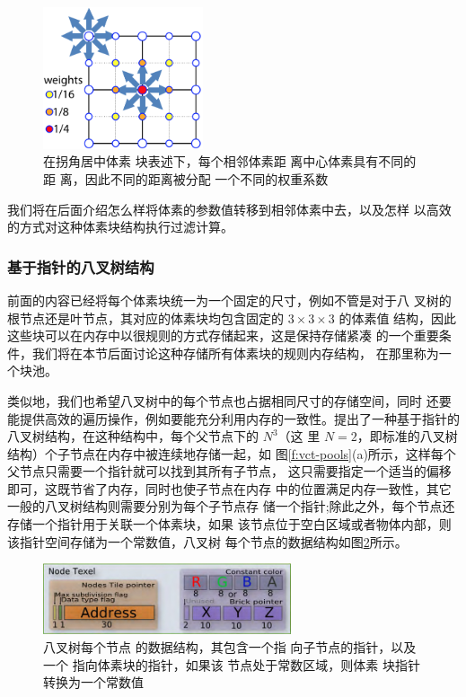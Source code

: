 \begin{figure}
	\sidecaption
	\includegraphics[width=0.42\textwidth]{figures/vct/vct-mipmapping}
	\caption{在拐角居中体素 块表述下，每个相邻体素距 离中心体素具有不同的距 离，因此不同的距离被分配 一个不同的权重系数}
	\label{f:vct-mipmapping}
\end{figure}

我们将在后面介绍怎么样将体素的参数值转移到相邻体素中去，以及怎样 以高效的方式对这种体素块结构执行过滤计算。



\subsubsection{基于指针的八叉树结构}
前面的内容已经将每个体素块统一为一个固定的尺寸，例如不管是对于八 叉树的根节点还是叶节点，其对应的体素块均包含固定的 $3\times  3\times  3$ 的体素值 结构，因此这些块可以在内存中以很规则的方式存储起来，这是保持存储紧凑 的一个重要条件，我们将在本节后面讨论这种存储所有体素块的规则内存结构， 在那里称为一个块池。

类似地，我们也希望八叉树中的每个节点也占据相同尺寸的存储空间，同时 还要能提供高效的遍历操作，例如要能充分利用内存的一致性。\cite{a:Gigavoxels:Avoxelbasedrenderingpipelineforefficientexplorationoflargeanddetailedscenes}提出了一种基于指针的八叉树结构，在这种结构中，每个父节点下的 $N^{3}$（这 里 $N = 2$，即标准的八叉树结构）个子节点在内存中被连续地存储一起，如 图\ref{f:vct-pools}(a)所示，这样每个父节点只需要一个指针就可以找到其所有子节点， 这只需要指定一个适当的偏移即可，这既节省了内存，同时也使子节点在内存 中的位置满足内存一致性，其它一般的八叉树结构则需要分别为每个子节点存 储一个指针;除此之外，每个节点还存储一个指针用于关联一个体素块，如果 该节点位于空白区域或者物体内部，则该指针空间存储为一个常数值，八叉树 每个节点的数据结构如图\ref{f:vct-node-texel}所示。

\begin{figure}
	\sidecaption
	\includegraphics[width=0.65\textwidth]{figures/vct/vct-node-texel}
	\caption{八叉树每个节点 的数据结构，其包含一个指 向子节点的指针，以及一个 指向体素块的指针，如果该 节点处于常数区域，则体素 块指针转换为一个常数值}
	\label{f:vct-node-texel}
\end{figure}

